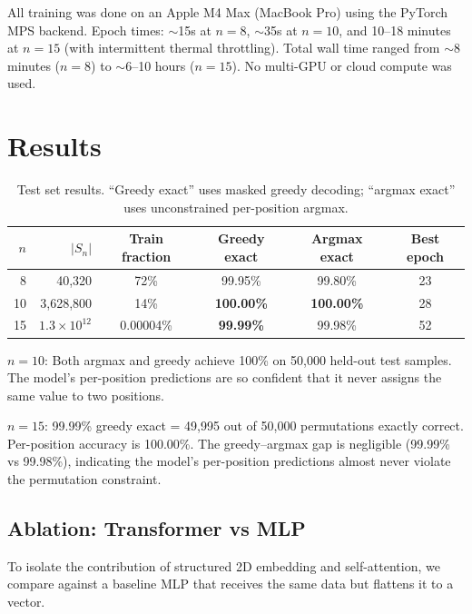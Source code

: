 \documentclass[11pt,a4paper]{article}
\begin{document}
All training was done on an Apple M4 Max (MacBook Pro) using the PyTorch MPS backend. Epoch times: $\sim$15s at $n{=}8$, $\sim$35s at $n{=}10$, and 10--18 minutes at $n{=}15$ (with intermittent thermal throttling). Total wall time ranged from $\sim$8 minutes ($n{=}8$) to $\sim$6--10 hours ($n{=}15$). No multi-GPU or cloud compute was used.

\section{Results}

\begin{table}[h]
\centering
\begin{tabular}{rrcccc}
\toprule
$n$ & $|S_n|$ & Train fraction & Greedy exact & Argmax exact & Best epoch \\
\midrule
8 & 40{,}320 & 72\% & 99.95\% & 99.80\% & 23 \\
10 & 3{,}628{,}800 & 14\% & \textbf{100.00\%} & \textbf{100.00\%} & 28 \\
15 & $1.3 \times 10^{12}$ & 0.00004\% & \textbf{99.99\%} & 99.98\% & 52 \\
\bottomrule
\end{tabular}
\caption{Test set results. ``Greedy exact'' uses masked greedy decoding; ``argmax exact'' uses unconstrained per-position argmax.}
\end{table}

\textbf{$n{=}10$}: Both argmax and greedy achieve 100\% on 50{,}000 held-out test samples. The model's per-position predictions are so confident that it never assigns the same value to two positions.

\textbf{$n{=}15$}: 99.99\% greedy exact = 49{,}995 out of 50{,}000 permutations exactly correct. Per-position accuracy is 100.00\%. The greedy--argmax gap is negligible (99.99\% vs 99.98\%), indicating the model's per-position predictions almost never violate the permutation constraint.

\subsection{Ablation: Transformer vs MLP}

To isolate the contribution of structured 2D embedding and self-attention, we compare against a baseline MLP that receives the same data but flattens it to a vector.
\end{document}
